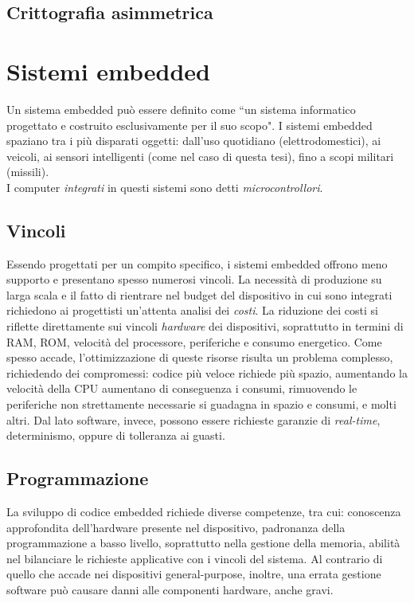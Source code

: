 \documentclass[target=bach,aauheader=,style=]{thud}
\begin{document}
        \subsection{Crittografia asimmetrica}

    \section{Sistemi embedded}
    Un sistema embedded può essere definito come ``un sistema informatico progettato e costruito esclusivamente per il suo scopo"\cite{embeddedsys}.
    I sistemi embedded spaziano tra i più disparati oggetti: dall'uso quotidiano (elettrodomestici), ai veicoli, ai sensori intelligenti (come nel caso di questa tesi), fino a scopi militari (missili).\\
    I computer \textit{integrati} in questi sistemi sono detti \textit{microcontrollori}\cite{architetture}.
    
    	\subsection{Vincoli}
    	Essendo progettati per un compito specifico, i sistemi embedded offrono meno supporto e presentano spesso numerosi vincoli. La necessità di produzione su larga scala e il fatto di rientrare nel budget del dispositivo in cui sono integrati richiedono ai progettisti un'attenta analisi dei \textit{costi}. La riduzione dei costi si riflette direttamente sui vincoli \textit{hardware} dei dispositivi, soprattutto in termini di RAM, ROM, velocità del processore, periferiche e consumo energetico. Come spesso accade, l'ottimizzazione di queste risorse risulta un problema complesso, richiedendo dei compromessi: codice più veloce richiede più spazio, aumentando la velocità della CPU aumentano di conseguenza i consumi, rimuovendo le periferiche non strettamente necessarie si guadagna in spazio e consumi, e molti altri.
    	Dal lato software, invece, possono essere richieste garanzie di \textit{real-time}, determinismo, oppure di tolleranza ai guasti.\cite{embeddedsys}
    	\subsection{Programmazione}
    	La sviluppo di codice embedded richiede diverse competenze, tra cui: conoscenza approfondita dell'hardware presente nel dispositivo, padronanza della programmazione a basso livello, soprattutto nella gestione della memoria, abilità nel bilanciare le richieste applicative con i vincoli del sistema.
    	Al contrario di quello che accade nei dispositivi general-purpose, inoltre, una errata gestione software può causare danni alle componenti hardware, anche gravi.
\end{document}
